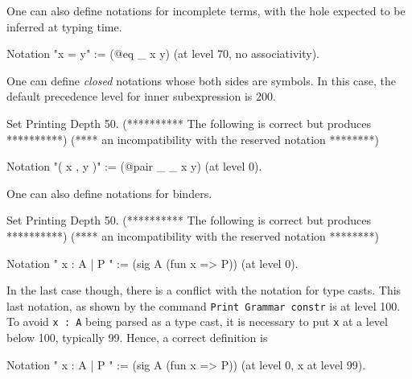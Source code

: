 One can also define notations for incomplete terms, with the hole
expected to be inferred at typing time.

\begin{coq_example*}
Notation "x = y" := (@eq _ x y) (at level 70, no associativity).
\end{coq_example*}

One can define {\em closed} notations whose both sides are symbols. In
this case, the default precedence level for inner subexpression is 200.

\begin{coq_eval}
Set Printing Depth 50.
(********** The following is correct but produces **********)
(**** an incompatibility with the reserved notation ********)
\end{coq_eval}
\begin{coq_example*}
Notation "( x , y )" := (@pair _ _ x y) (at level 0).
\end{coq_example*}

One can also define notations for binders.

\begin{coq_eval}
Set Printing Depth 50.
(********** The following is correct but produces **********)
(**** an incompatibility with the reserved notation ********)
\end{coq_eval}
\begin{coq_example*}
Notation "{ x : A  |  P }" := (sig A (fun x => P)) (at level 0).
\end{coq_example*}

In the last case though, there is a conflict with the notation for
type casts. This last notation, as shown by the command {\tt Print Grammar
constr} is at level 100. To avoid \verb=x : A= being parsed as a type cast,
it is necessary to put {\tt x} at a level below 100, typically 99. Hence, a
correct definition is 

\begin{coq_example*}
Notation "{ x : A  |  P }" := (sig A (fun x => P)) (at level 0, x at level 99).
\end{coq_example*}

%

